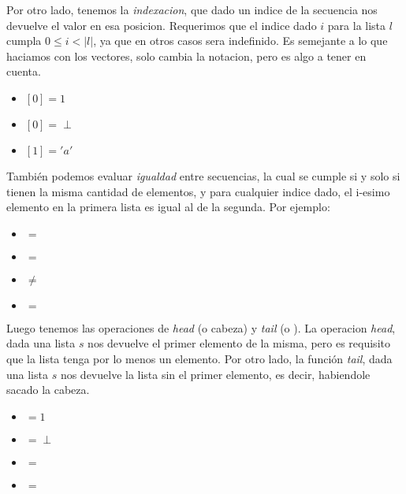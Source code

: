 \documentclass{article}
\begin{document}
Por otro lado, tenemos la \textit{indexacion}, que dado un indice de la secuencia nos devuelve el valor en esa posicion. Requerimos que el indice dado $i$ para la lista $l$ cumpla $0 \leq i < |l|$, ya que en otros casos sera indefinido. Es semejante a lo que haciamos con los vectores, solo cambia la notacion, pero es algo a tener en cuenta.

\begin{multicols}{3}
\begin{center}
	\begin{itemize}
	
		\item[] $[0] = 1$
		\item[] \lista{}$[0] = \perp$
		\item[] $[1] = 'a'$
	
	\end{itemize}
\end{center}
\end{multicols}

También podemos evaluar \textit{igualdad} entre secuencias, la cual se cumple si y solo si tienen la misma cantidad de elementos, y para cualquier indice dado, el i-esimo elemento en la primera lista es igual al de la segunda. Por ejemplo:

\begin{multicols}{2}
\begin{center}
	\begin{itemize}
	
		\item[] $=$
		\item[] \lista{}$=$\lista{}
		\item[] $\neq$\lista{1, 3, 2}
		\item[] $=$\lista{2, 2, 2}
	
	\end{itemize}
\end{center}
\end{multicols}

Luego tenemos las operaciones de \textit{head} (o cabeza) y \textit{tail} (o ). La operacion \textit{head}, dada una lista $s$ nos devuelve el primer elemento de la misma, pero es requisito que la lista tenga por lo menos un elemento. Por otro lado, la función \textit{tail}, dada una lista $s$ nos devuelve la lista sin el primer elemento, es decir, habiendole sacado la cabeza.

\begin{multicols}{2}
\begin{center}
	\begin{itemize}
	
		\item[] $= 1$
		\item[] \head{\lista{}}$= \perp$
		\item[]  $=$ 
		\item[]  $=$ \lista{}
	
	\end{itemize}
\end{center}
\end{multicols}
\end{document}

